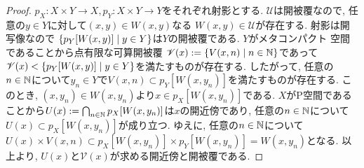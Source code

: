 \documentclass[uplatex, dvipdfmx, a4paper, 12pt, class=jsbook, crop=false]{standalone}
\begin{document}
\begin{proof}
	$ p_X \colon X \times Y \to X, p_Y \colon X \times Y \to Y $をそれぞれ射影とする. 
	$ \mathscr{U} $は開被覆なので, 任意の$ y \in Y $に対して$ (x, y) \in W(x, y) $なる
	$ W(x, y) \in \mathscr{U} $が存在する. 射影は開写像なので
	$ \setcomp{p_Y[W(x, y)]}{y \in Y} $は$ Y $の開被覆である. 
	$ Y $がメタコンパクト \Lindelof 空間であることから点有限な可算開被覆
	$ \mathscr{V}(x) \defeq \setcomp{V(x, n)}{n \in \N} $であって
	$ \mathscr{V}(x) < \setcomp{p_Y[W(x, y)]}{y \in Y} $を満たすものが存在する. 
	したがって, 任意の$ n \in \mathbb{N} $について$ y_n \in Y $で$ V(x, n) \subset p_Y[W(x, y_n)] $を満たすものが存在する. 
	このとき, $ (x, y_n) \in W(x, y_n) $より$ x \in p_X[W(x, y_n)] $である. 
	$ X $がP空間であることから$ U(x) \mathrel{:=} \bigcap_{n \in \mathbb{N}} p_X[W(x, y_n)] $は$ x $の開近傍であり, 
	任意の$ n \in \mathbb{N} $について$ U(x) \subset p_X[W(x, y_n)] $が成り立つ. 
	ゆえに, 任意の$ n \in \mathbb{N} $について
	$ U(x) \times V(x, n) \subset p_X[W(x, y_n)] \times p_Y[W(x, y_n)] = W(x, y_n) $となる. 
	以上より, $ U(x) $と$ \mathscr{V}(x) $が求める開近傍と開被覆である. 
\end{proof}
\end{document}
